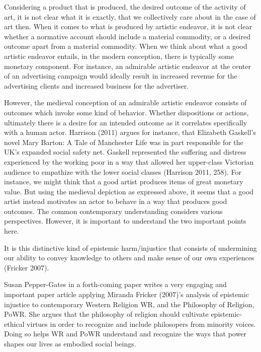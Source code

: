 \documentclass[
  letterpaper,
  DIV=11,
  numbers=noendperiod]{scrreprt}
\begin{document}
\begin{tcolorbox}[enhanced jigsaw, arc=.35mm, breakable, rightrule=.15mm, colback=white, colframe=quarto-callout-important-color-frame, bottomrule=.15mm, leftrule=.75mm, opacityback=0, toprule=.15mm, left=2mm]
\begin{tcolorbox}[enhanced jigsaw, arc=.35mm, breakable, rightrule=.15mm, colback=white, colframe=quarto-callout-tip-color-frame, bottomrule=.15mm, leftrule=.75mm, opacityback=0, toprule=.15mm, left=2mm]
Considering a product that is produced, the desired outcome of the
activity of art, it is not clear what it is exactly, that we
collectively care about in the case of art then. When it comes to what
is produced by artistic endeavor, it is not clear whether a normative
account should include a material commodity, or a desired outcome apart
from a material commodity. When we think about what a good artistic
endeavor entails, in the modern conception, there is typically some
monetary component. For instance, an admirable artistic endeavor at the
center of an advertising campaign would ideally result in increased
revenue for the advertising clients and increased business for the
advertiser.

However, the medieval conception of an admirable artistic endeavor
consists of outcomes which invoke some kind of behavior. Whether
dispositions or actions, ultimately there is a desire for an intended
outcome as it correlates specifically with a human actor. Harrison
(2011) argues for instance, that Elizabeth Gaskell's novel Mary Barton:
A Tale of Manchester Life was in part responsible for the UK's expanded
social safety net. Gaskell represented the suffering and distress
experienced by the working poor in a way that allowed her upper-class
Victorian audience to empathize with the lower social classes (Harrison
2011, 258). For instance, we might think that a good artist produces
items of great monetary value. But using the medieval depiction as
expressed above, it seems that a good artist instead motivates an actor
to behave in a way that produces good outcomes. The common contemporary
understanding considers various perspectives. However, it is important
to understand the two important points here.

It is this distinctive kind of epistemic harm/injustice that consists of
undermining our ability to convey knowledge to others and make sense of
our own experiences (Fricker 2007).

Susan Pepper-Gates in a forth-coming paper writes a very engaging and
important paper article applying Miranda Fricker (2007)'s analysis of
epistemic injustice to contemporary Western Religion WR, and the
Philosophy of Religion, PoWR. She argues that the philosophy of religion
should cultivate epistemic-ethical virtues in order to recognize and
include philosopers from minority voices. Doing so helps WR and PoWR
understand and recognize the ways that power shapes our lives as
embodied social beings.


\end{tcolorbox}
\end{tcolorbox}
\end{document}
